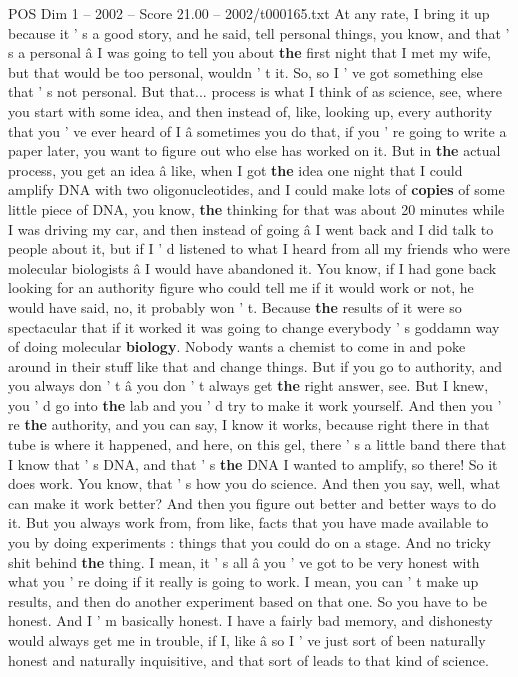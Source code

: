\begin{textsample}{POS Dim 1 – 2002 – Score 21.00 – 2002/t000165.txt}
At any rate, I bring it up because it ' s a good story, and he said, tell personal things, you know, and that ' s a personal â I was going to tell you about \textbf{the} first night that I met my wife, but that would be too personal, wouldn ' t it.
So, so I ' ve got something else that ' s not personal.
But that... process is what I think of as science, see, where you start with some idea, and then instead of, like, looking up, every authority that you ' ve ever heard of I â sometimes you do that, if you ' re going to write a paper later, you want to figure out who else has worked on it.
But in \textbf{the} actual process, you get an idea â like, when I got \textbf{the} idea one night that I could amplify DNA with two oligonucleotides, and I could make lots of \textbf{copies} of some little piece of DNA, you know, \textbf{the} thinking for that was about 20 minutes while I was driving my car, and then instead of going â I went back and I did talk to people about it, but if I ' d listened to what I heard from all my friends who were molecular biologists â I would have abandoned it.
You know, if I had gone back looking for an authority figure who could tell me if it would work or not, he would have said, no, it probably won ' t.
Because \textbf{the} results of it were so spectacular that if it worked it was going to change everybody ' s goddamn way of doing molecular \textbf{biology}.
Nobody wants a chemist to come in and poke around in their stuff like that and change things.
But if you go to authority, and you always don ' t â you don ' t always get \textbf{the} right answer, see.
But I knew, you ' d go into \textbf{the} lab and you ' d try to make it work yourself.
And then you ' re \textbf{the} authority, and you can say, I know it works, because right there in that tube is where it happened, and here, on this gel, there ' s a little band there that I know that ' s DNA, and that ' s \textbf{the} DNA I wanted to amplify, so there!
So it does work.
You know, that ' s how you do science.
And then you say, well, what can make it work better?
And then you figure out better and better ways to do it.
But you always work from, from like, facts that you have made available to you by doing experiments : things that you could do on a stage.
And no tricky shit behind \textbf{the} thing.
I mean, it ' s all â you ' ve got to be very honest with what you ' re doing if it really is going to work.
I mean, you can ' t make up results, and then do another experiment based on that one.
So you have to be honest.
And I ' m basically honest.
I have a fairly bad memory, and dishonesty would always get me in trouble, if I, like â so I ' ve just sort of been naturally honest and naturally inquisitive, and that sort of leads to that kind of science.

\end{textsample}
